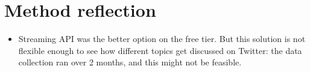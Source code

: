 \section{Method reflection}
\begin{itemize}
    \item Streaming API was the better option on the free tier. But this solution is not flexible enough to see how different topics get discussed on Twitter: the data collection ran over 2 months, and this might not be feasible.
\end{itemize}